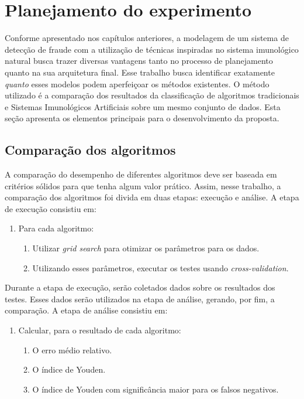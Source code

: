 \chapter{Planejamento do experimento}
\label{chap:prop}

Conforme apresentado nos capítulos anteriores, a modelagem de um sistema de detecção de fraude com a utilização de técnicas inspiradas no sistema imunológico natural busca trazer diversas vantagens tanto no processo de planejamento quanto na sua arquitetura final. Esse trabalho busca identificar exatamente \emph{quanto} esses modelos podem aperfeiçoar os métodos existentes. O método utilizado é a comparação dos resultados da classificação de algoritmos tradicionais e Sistemas Imunológicos Artificiais sobre um mesmo conjunto de dados. Esta seção apresenta os elementos principais para o desenvolvimento da proposta.

\section{Comparação dos algoritmos}

A comparação do desempenho de diferentes algoritmos deve ser baseada em critérios sólidos para que tenha algum valor prático. Assim, nesse trabalho, a comparação dos algoritmos foi divida em duas etapas: execução e análise. A etapa de execução consistiu em:

\begin{enumerate}
    \item Para cada algoritmo:
        \begin{enumerate}
            \item Utilizar \emph{grid search} para otimizar os parâmetros para os dados.
            \item Utilizando esses parâmetros, executar os testes usando \emph{cross-validation}.
        \end{enumerate}
\end{enumerate}

Durante a etapa de execução, serão coletados dados sobre os resultados dos testes. Esses dados serão utilizados na etapa de análise, gerando, por fim, a comparação. A etapa de análise consistiu em:

\begin{enumerate}
    \item Calcular, para o resultado de cada algoritmo:
        \begin{enumerate}
            \item O erro médio relativo.
            \item O índice de Youden.
            \item O índice de Youden com significância maior para os falsos negativos.
        \end{enumerate}
\end{enumerate}

